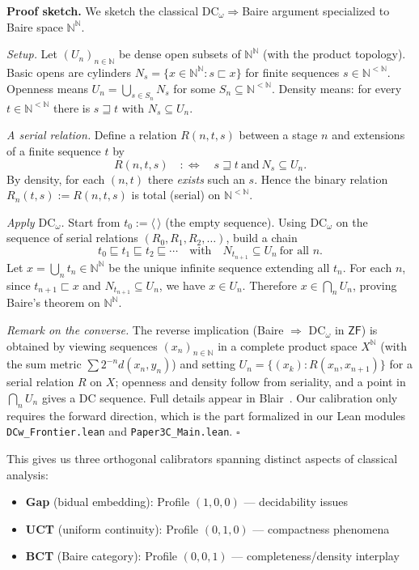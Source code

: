 \documentclass[11pt]{article}
\newenvironment{proof}[1][Proof]{\noindent\textbf{#1.}\hspace{0.5em}}{\hfill$\square$\par}
\newcommand{\N}{\mathbb{N}}
\newcommand{\DCw}{\mathrm{DC}_\omega}
\begin{document}
\begin{proof}[Proof sketch]
We sketch the classical $\DCw\Rightarrow$Baire argument specialized to Baire space $\N^\N$.

\emph{Setup.} Let $(U_n)_{n\in\N}$ be dense open subsets of $\N^\N$ (with the product topology).
Basic opens are cylinders $N_s=\{x\in\N^\N : s\sqsubset x\}$ for finite sequences $s\in\N^{<\N}$.
Openness means $U_n=\bigcup_{s\in S_n} N_s$ for some $S_n\subseteq\N^{<\N}$. Density means:
for every $t\in\N^{<\N}$ there is $s\sqsupseteq t$ with $N_s\subseteq U_n$.

\emph{A serial relation.} Define a relation $R(n,t,s)$ between a stage $n$ and extensions of a
finite sequence $t$ by
\[
R(n,t,s)\quad:\Longleftrightarrow\quad s\sqsupseteq t\ \text{and}\ N_s\subseteq U_n.
\]
By density, for each $(n,t)$ there \emph{exists} such an $s$. Hence the binary relation
$R_n(t,s):=R(n,t,s)$ is total (serial) on $\N^{<\N}$.

\emph{Apply $\DCw$.} Start from $t_0:=\langle\,\rangle$ (the empty sequence). Using $\DCw$ on
the sequence of serial relations $(R_0,R_1,R_2,\dots)$, build a chain
\[
t_0\sqsubseteq t_1\sqsubseteq t_2\sqsubseteq \cdots
\quad\text{with}\quad N_{t_{n+1}}\subseteq U_n\ \text{for all }n.
\]
Let $x=\bigcup_{n} t_n\in\N^\N$ be the unique infinite sequence extending all $t_n$. For each $n$,
since $t_{n+1}\sqsubset x$ and $N_{t_{n+1}}\subseteq U_n$, we have $x\in U_n$. Therefore
$x\in\bigcap_n U_n$, proving Baire's theorem on $\N^\N$.

\emph{Remark on the converse.} The reverse implication (Baire $\Rightarrow$ $\DCw$ in $\mathsf{ZF}$)
is obtained by viewing sequences $(x_n)_{n\in\N}$ in a complete product space $X^\N$ (with the sum
metric $\sum 2^{-n}d(x_n,y_n)$) and setting $U_n=\{(x_k): R(x_n,x_{n+1})\}$ for a serial relation
$R$ on $X$; openness and density follow from seriality, and a point in $\bigcap_n U_n$ gives a DC
sequence. Full details appear in Blair~\cite{Blair77}. Our calibration only requires the forward
direction, which is the part formalized in our Lean modules \texttt{DCw\_Frontier.lean} and \texttt{Paper3C\_Main.lean}.
\end{proof}

This gives us three orthogonal calibrators spanning distinct aspects of classical analysis:
\begin{itemize}
\item \textbf{Gap} (bidual embedding): Profile $(1, 0, 0)$ — decidability issues
\item \textbf{UCT} (uniform continuity): Profile $(0, 1, 0)$ — compactness phenomena  
\item \textbf{BCT} (Baire category): Profile $(0, 0, 1)$ — completeness/density interplay
\end{itemize}
\end{document}
